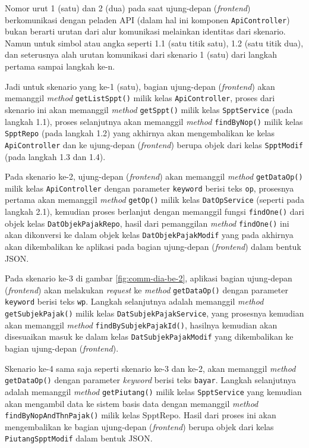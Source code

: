 Nomor urut 1 (satu) dan 2 (dua) pada saat ujung-depan (\textit{frontend}) berkomunikasi dengan peladen API (dalam hal ini komponen \texttt{ApiController}) bukan berarti urutan dari alur komunikasi melainkan identitas dari skenario. Namun untuk simbol atau angka seperti 1.1 (satu titik satu), 1.2 (satu titik dua), dan seterusnya alah urutan komunikasi dari skenario 1 (satu) dari langkah pertama sampai langkah ke-n.

Jadi untuk skenario yang ke-1 (satu), bagian ujung-depan (\textit{frontend}) akan memanggil \textit{method} \texttt{getListSppt()} milik kelas \texttt{ApiController}, proses dari skenario ini akan memanggil \textit{method} \texttt{getSppt()} milik kelas \texttt{SpptService} (pada langkah 1.1), proses selanjutnya akan memanggil \textit{method} \texttt{findByNop()} milik kelas \texttt{SpptRepo} (pada langkah 1.2) yang akhirnya akan mengembalikan ke kelas \texttt{ApiController} dan ke ujung-depan (\textit{frontend}) berupa objek dari kelas \texttt{SpptModif} (pada langkah 1.3 dan 1.4).

Pada skenario ke-2, ujung-depan (\textit{frontend}) akan memanggil \textit{method} \texttt{getDataOp()} milik kelas \texttt{ApiController} dengan parameter \texttt{keyword} berisi teks \texttt{op}, prosesnya pertama akan memanggil \textit{method} \texttt{getOp()} milik kelas \texttt{DatOpService} (seperti pada langkah 2.1), kemudian proses berlanjut dengan memanggil fungsi \texttt{findOne()} dari objek kelas \texttt{DatObjekPajakRepo}, hasil dari pemanggilan \textit{method} \texttt{findOne()} ini akan dikonversi ke dalam objek kelas \texttt{DatObjekPajakModif} yang pada akhirnya akan dikembalikan ke aplikasi pada bagian ujung-depan (\textit{frontend}) dalam bentuk JSON.

Pada skenario ke-3 di gambar \ref{fig:comm-dia-be-2}, aplikasi bagian ujung-depan (\textit{frontend}) akan melakukan \textit{request} ke \textit{method} \texttt{getDataOp()} dengan parameter \texttt{keyword} berisi teks \texttt{wp}. Langkah selanjutnya adalah memanggil \textit{method} \texttt{getSubjekPajak()} milik kelas \texttt{DatSubjekPajakService}, yang prosesnya kemudian akan memanggil \textit{method} \texttt{findBySubjekPajakId()}, hasilnya kemudian akan disesuaikan masuk ke dalam kelas \texttt{DatSubjekPajakModif} yang dikembalikan ke bagian ujung-depan (\textit{frontend}).

Skenario ke-4 sama saja seperti skenario ke-3 dan ke-2, akan memanggil \textit{method} \texttt{getDataOp()} dengan parameter \textit{keyword} berisi teks \texttt{bayar}. Langkah selanjutnya adalah memanggil \textit{method} \texttt{getPiutang()} milik kelas \texttt{SpptService} yang kemudian akan mengambil data ke sistem basis data dengan memanggil \textit{method} \texttt{findByNopAndThnPajak()} milik kelas SpptRepo. Hasil dari proses ini akan mengembalikan ke bagian ujung-depan (\textit{frontend}) berupa objek dari kelas \texttt{PiutangSpptModif} dalam bentuk JSON.

